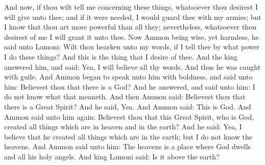 And now, if thou wilt tell me concerning these things, whatsoever thou desirest I will give unto thee; and if it were needed, I would guard thee with my armies; but I know that thou art more powerful than all they; nevertheless, whatsoever thou desirest of me I will grant it unto thee.
\bverse \iffalse Now Ammon being wise, yet harmless, he said unto Lamoni: Wilt thou hearken unto my words, if I tell thee by what power I do these things? And this is the thing that I desire of thee. \fi
Now Ammon being wise, yet harmless, he said unto Lamoni: Wilt thou hearken unto my words, if I tell thee by what power I do these things? And this is the thing that I desire of thee.
\bverse \iffalse And the king answered him, and said: Yea, I will believe all thy words. And thus he was caught with guile. \fi
And the king answered him, and said: Yea, I will believe all thy words. And thus he was caught with guile.
\bverse \iffalse And Ammon began to speak unto him with boldness, and said unto him: Believest thou that there is a God? \fi
And Ammon began to speak unto him with boldness, and said unto him: Believest thou that there is a God?
\bverse \iffalse And he answered, and said unto him: I do not know what that meaneth. \fi
And he answered, and said unto him: I do not know what that meaneth.
\bverse \iffalse And then Ammon said: Believest thou that there is a Great Spirit? \fi
And then Ammon said: Believest thou that there is a Great Spirit?
\bverse \iffalse And he said, Yea. \fi
And he said, Yea.
\bverse \iffalse And Ammon said: This is God. And Ammon said unto him again: Believest thou that this Great Spirit, who is God, created all things which are in heaven and in the earth? \fi
And Ammon said: This is God. And Ammon said unto him again: Believest thou that this Great Spirit, who is God, created all things which are in heaven and in the earth?
\bverse \iffalse And he said: Yea, I believe that he created all things which are in the earth; but I do not know the heavens. \fi
And he said: Yea, I believe that he created all things which are in the earth; but I do not know the heavens.
\bverse \iffalse And Ammon said unto him: The heavens is a place where God dwells and all his holy angels. \fi
And Ammon said unto him: The heavens is a place where God dwells and all his holy angels.
\bverse \iffalse And king Lamoni said: Is it above the earth? \fi
And king Lamoni said: Is it above the earth?
\bverse \iffalse And Ammon said: Yea, and he looketh down upon all the children of men; and he knows all the thoughts and intents of the heart; for by his hand were they all created from the beginning. \fi
